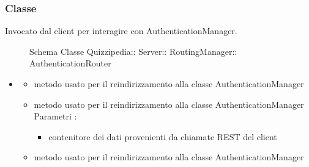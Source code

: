 \subsubsection{Classe }
Invocato dal client per interagire con AuthenticationManager.
\begin{figure}[H]
\centering
\noindent{}
\caption[Schema Classe AuthenticationRouter]{Schema Classe Quizzipedia:: Server:: RoutingManager:: AuthenticationRouter}
\end{figure}
\begin{itemize}
\item {}
\begin{itemize}
\item {}
\newline
metodo usato per il reindirizzamento alla classe AuthenticationManager
\newline
\item {}
\newline
metodo usato per il reindirizzamento alla classe AuthenticationManager
\newline
Parametri :
\begin{itemize}
\item {}
\newline
contenitore dei dati provenienti da chiamate REST del client
\end{itemize}
\item {}
\newline
metodo usato per il reindirizzamento alla classe AuthenticationManager
\newline
\end{itemize}
\end{itemize}
